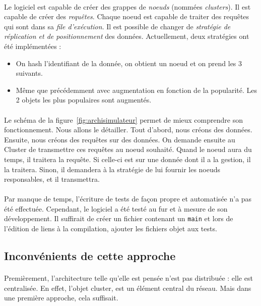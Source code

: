 \documentclass[12pt]{article}
\begin{document}
\paragraph{}Le logiciel est capable de créer des grappes de \textit{noeuds} (nommées \textit{clusters}). Il est capable de créer des \textit{requêtes}. Chaque noeud est capable de traiter des requêtes qui sont dans sa \textit{file d'exécution}. Il est possible de changer de \textit{stratégie de réplication et de positionnement} des données. Actuellement, deux stratégies ont été implémentées :

\begin{itemize}
    \item On hash l'identifiant de la donnée, on obtient un noeud et on prend les 3 suivants.
    \item Même que précédemment avec augmentation en fonction de la popularité. Les 2 objets les plus populaires sont augmentés.
\end{itemize}

\paragraph{}Le schéma de la figure~\ref{fig:archisimulateur} permet de mieux comprendre son fonctionnement. Nous allons le détailler. \newline
Tout d'abord, nous créons des données. Ensuite, nous créons des requêtes sur des données. On demande ensuite au Cluster de transmettre ces requêtes au noeud souhaité. Quand le noeud aura du temps, il traitera la requête. Si celle-ci est sur une donnée dont il a la gestion, il la traitera. Sinon, il demandera à la stratégie de lui fournir les noeuds responsables, et il transmettra.

\paragraph{}Par manque de temps, l'écriture de tests de façon propre et automatisée n'a pas été effectuée. Cependant, le logiciel a été testé au fur et à mesure de son développement. Il suffirait de créer un fichier contenant un \texttt{main} et lors de l'édition de liens à la compilation, ajouter les fichiers objet aux tests.

\subsection{Inconvénients de cette approche}

\paragraph{}Premièrement, l'architecture telle qu'elle est pensée n'est pas distribuée : elle est centralisée. En effet, l'objet cluster, est un élément central du réseau. Mais dans une première approche, cela suffisait.
\end{document}
